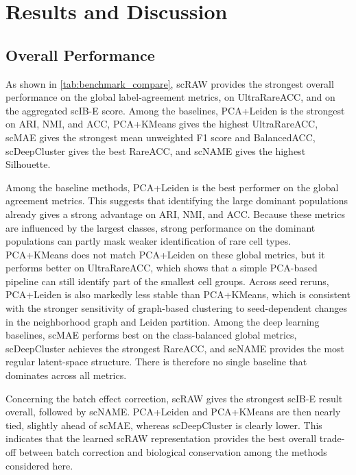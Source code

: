\documentclass[11pt,a4paper]{article}
\begin{document}
\section{Results and Discussion}

\subsection{Overall Performance}

As shown in \autoref{tab:benchmark_compare}, scRAW provides the strongest overall performance on the global label-agreement metrics, on UltraRareACC, and on the aggregated scIB-E score. Among the baselines, PCA+Leiden is the strongest on ARI, NMI, and ACC, PCA+KMeans gives the highest UltraRareACC, scMAE gives the strongest mean unweighted F1 score and BalancedACC, scDeepCluster gives the best RareACC, and scNAME gives the highest Silhouette.

Among the baseline methods, PCA+Leiden is the best performer on
the global agreement metrics. This suggests
that identifying the large dominant populations already gives a
strong advantage on ARI, NMI, and ACC. Because these metrics are influenced by the largest classes, strong performance on the dominant populations can partly mask weaker identification of rare cell types. PCA+KMeans does not match
PCA+Leiden on these global metrics, but it performs better on
UltraRareACC, which shows that a simple PCA-based pipeline can still
identify part of the smallest cell groups. Across seed reruns, PCA+Leiden is also markedly less stable than PCA+KMeans, which is consistent with the stronger sensitivity of graph-based clustering to seed-dependent changes in the neighborhood graph and Leiden partition. Among the deep learning baselines, scMAE performs best on the class-balanced global metrics,
scDeepCluster achieves the strongest RareACC, and scNAME provides the most
regular latent-space structure. There is therefore
no single baseline that dominates across all metrics.

Concerning the batch effect correction, scRAW gives the strongest scIB-E result overall, followed by scNAME. PCA+Leiden and PCA+KMeans are then nearly tied, slightly ahead of scMAE, whereas scDeepCluster is clearly lower. This indicates that the learned scRAW representation provides the best overall trade-off between batch correction and biological conservation among the methods considered here.
\end{document}
